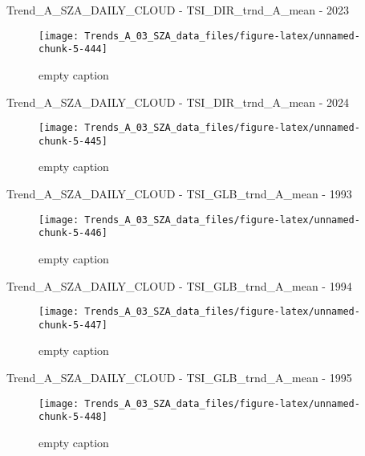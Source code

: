 \documentclass[
  10pt,
  a4paper,oneside]{article}
\begin{document}
Trend\_A\_SZA\_DAILY\_CLOUD - TSI\_DIR\_trnd\_A\_mean - 2023

\begin{figure}[!ht]

{\centering \texttt{[image: Trends\_A\_03\_SZA\_data\_files/figure-latex/unnamed-chunk-5-444]} 

}

\caption{ empty caption }\label{fig:unnamed-chunk-5-444}
\end{figure}

Trend\_A\_SZA\_DAILY\_CLOUD - TSI\_DIR\_trnd\_A\_mean - 2024

\begin{figure}[!ht]

{\centering \texttt{[image: Trends\_A\_03\_SZA\_data\_files/figure-latex/unnamed-chunk-5-445]} 

}

\caption{ empty caption }\label{fig:unnamed-chunk-5-445}
\end{figure}

Trend\_A\_SZA\_DAILY\_CLOUD - TSI\_GLB\_trnd\_A\_mean - 1993

\begin{figure}[!ht]

{\centering \texttt{[image: Trends\_A\_03\_SZA\_data\_files/figure-latex/unnamed-chunk-5-446]} 

}

\caption{ empty caption }\label{fig:unnamed-chunk-5-446}
\end{figure}

Trend\_A\_SZA\_DAILY\_CLOUD - TSI\_GLB\_trnd\_A\_mean - 1994

\begin{figure}[!ht]

{\centering \texttt{[image: Trends\_A\_03\_SZA\_data\_files/figure-latex/unnamed-chunk-5-447]} 

}

\caption{ empty caption }\label{fig:unnamed-chunk-5-447}
\end{figure}

Trend\_A\_SZA\_DAILY\_CLOUD - TSI\_GLB\_trnd\_A\_mean - 1995

\begin{figure}[!ht]

{\centering \texttt{[image: Trends\_A\_03\_SZA\_data\_files/figure-latex/unnamed-chunk-5-448]} 

}

\caption{ empty caption }\label{fig:unnamed-chunk-5-448}
\end{figure}
\end{document}
